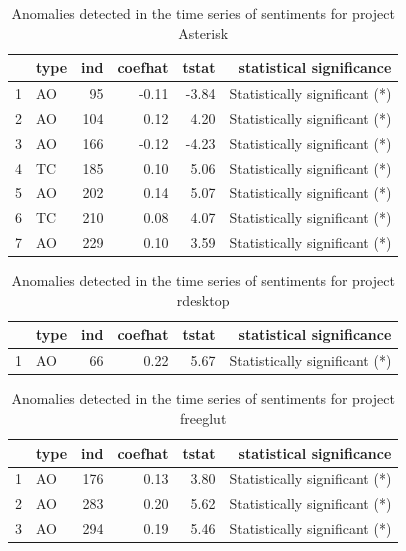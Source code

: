 \documentclass[12pt]{report}
\begin{document}
\begin{table}
\centering
\caption{Anomalies detected in the time series of sentiments for project Asterisk}
\begin{tabular}{rlrrrr}
  \hline
 & type & ind & coefhat & tstat & statistical significance\\ 
  \hline
1 & AO &  95 & -0.11 & -3.84 & Statistically significant (*) \\ 
  2 & AO & 104 & 0.12 & 4.20  & Statistically significant (*)\\ 
  3 & AO & 166 & -0.12 & -4.23 & Statistically significant (*) \\ 
  4 & TC & 185 & 0.10 & 5.06  & Statistically significant (*)\\ 
  5 & AO & 202 & 0.14 & 5.07  & Statistically significant (*)\\ 
  6 & TC & 210 & 0.08 & 4.07  & Statistically significant (*)\\ 
  7 & AO & 229 & 0.10 & 3.59  & Statistically significant (*)\\ 
   \hline
\end{tabular}
\end{table}


\begin{table}
\centering
\caption{Anomalies detected in the time series of sentiments for project rdesktop}
\begin{tabular}{rlrrrr}
  \hline
 & type & ind & coefhat & tstat & statistical significance\\ 
  \hline
1 & AO &  66 & 0.22 & 5.67  & Statistically significant (*)\\ 
   \hline
\end{tabular}
\end{table}


\begin{table}
\centering
\caption{Anomalies detected in the time series of sentiments for project freeglut}
\begin{tabular}{rlrrrr}
  \hline
 & type & ind & coefhat & tstat & statistical significance\\ 
  \hline
1 & AO & 176 & 0.13 & 3.80  & Statistically significant (*)\\ 
  2 & AO & 283 & 0.20 & 5.62  & Statistically significant (*)\\ 
  3 & AO & 294 & 0.19 & 5.46  & Statistically significant (*)\\ 
   \hline
\end{tabular}
\end{table}
\end{document}
